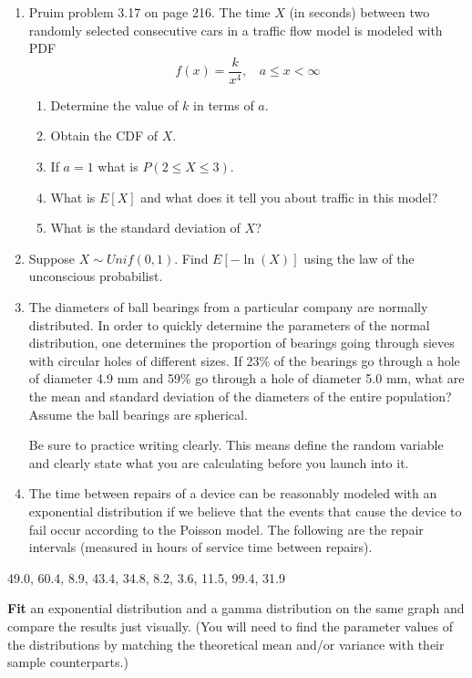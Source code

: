 \documentclass[
]{article}
\providecommand{\tightlist}{%
  \setlength{\itemsep}{0pt}\setlength{\parskip}{0pt}}
\begin{document}
\begin{enumerate}
\def\labelenumi{\arabic{enumi}.}
\item
  Pruim problem 3.17 on page 216. The time \(X\) (in seconds) between
  two randomly selected consecutive cars in a traffic flow model is
  modeled with PDF \[f(x) = \frac{k}{x^4}, \ \  \ \ a \leq x < \infty\]

  \begin{enumerate}
  \def\labelenumii{\alph{enumii}.}
  \tightlist
  \item
    Determine the value of \(k\) in terms of \(a\).
  \item
    Obtain the CDF of \(X\).
  \item
    If \(a=1\) what is \(P(2 \leq X \leq 3)\).
  \item
    What is \(E\left[X\right]\) and what does it tell you about traffic
    in this model?
  \item
    What is the standard deviation of \(X\)?
  \end{enumerate}
\item
  Suppose \(X \sim Unif(0,1)\). Find \(E\left[ -\ln(X) \right]\) using
  the law of the unconscious probabilist.
\item
  The diameters of ball bearings from a particular company are normally
  distributed. In order to quickly determine the parameters of the
  normal distribution, one determines the proportion of bearings going
  through sieves with circular holes of different sizes. If 23\% of the
  bearings go through a hole of diameter 4.9 mm and 59\% go through a
  hole of diameter 5.0 mm, what are the mean and standard deviation of
  the diameters of the entire population? Assume the ball bearings are
  spherical.

  Be sure to practice writing clearly. This means define the random
  variable and clearly state what you are calculating before you launch
  into it.
\item
  The time between repairs of a device can be reasonably modeled with an
  exponential distribution if we believe that the events that cause the
  device to fail occur according to the Poisson model. The following are
  the repair intervals (measured in hours of service time between
  repairs).
\end{enumerate}

49.0, 60.4, 8.9, 43.4, 34.8, 8.2, 3.6, 11.5, 99.4, 31.9

\textbf{Fit} an exponential distribution and a gamma distribution on the
same graph and compare the results just visually. (You will need to find
the parameter values of the distributions by matching the theoretical
mean and/or variance with their sample counterparts.)
\end{document}
